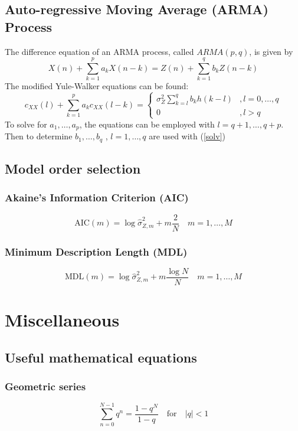\documentclass[accentcolor=tud4c,9.5pt,nochapname,bigchapter,paper=a5report]{tudreport}
\begin{document}
\section{Auto-regressive Moving Average (ARMA) Process}
The difference equation of an ARMA process, called $ARMA(p,q)$, is given by
\begin{equation}
X(n)+\sum\limits_{k=1}^p a_kX(n-k) = Z(n)+\sum\limits_{k=1}^q b_k Z(n-k)
\end{equation}
The modified Yule-Walker equations can be found:
\begin{equation}
c_{XX}(l)+\sum\limits_{k=1}^p a_k c_{XX}(l-k) = \begin{cases}
\sigma_Z^2\sum_{k=l}^q b_kh(k-l) &,l=0,\ldots,q\\
0&,l>q
\end{cases}
\end{equation}
To solve for $a_1,\ldots,a_p$, the equations can be employed with $l=q+1,\ldots,q+p$. Then to determine $b_1,\ldots,b_q$ , $l=1,\ldots,q$ are used with (\ref{solv})

\section{Model order selection}
\subsection{Akaine's Information Criterion (AIC)}
\begin{equation}
\text{AIC}(m)=\log \hat{\sigma}_{Z,m}^2 + m\frac{2}{N} \quad m=1,\ldots,M
\end{equation}
\subsection{Minimum Description Length (MDL)}
\begin{equation}
\text{MDL}(m)=\log \hat{\sigma}_{Z,m}^2 + m\frac{\log N}{N} \quad m=1,\ldots,M
\end{equation}
\chapter{Miscellaneous}
\section{Useful mathematical equations}
\subsection{Geometric series}
\begin{equation}
\sum\limits_{n=0}^{N-1} q^n = \frac{1-q^N}{1-q} \quad \text{for} \quad|q|<1
\end{equation} 
\end{document}
